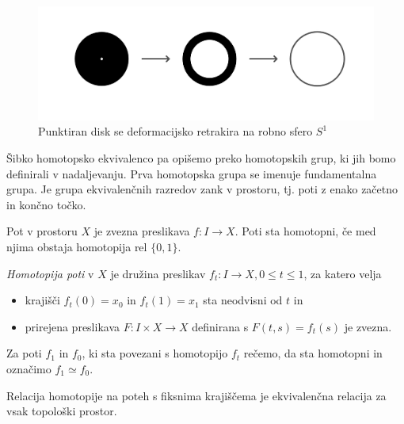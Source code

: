 \documentclass[mat1]{fmfdelo}
\begin{document}
\begin{figure}[h!]
    \centering
    \includegraphics[width=1\linewidth]{def-retract.png}
    \caption{Punktiran disk se deformacijsko retrakira na robno sfero $S^1$}
\end{figure}

Šibko homotopsko ekvivalenco pa opišemo preko homotopskih grup, ki
 jih bomo definirali v nadaljevanju. Prva homotopska grupa se imenuje
  fundamentalna grupa. Je grupa ekvivalenčnih razredov zank v prostoru, 
 tj. poti z enako začetno in končno točko.

Pot v prostoru $X$ je zvezna preslikava $ f\colon  I \rightarrow X$. Poti sta homotopni, če med njima obstaja homotopija rel $\{0,1\}$.
\begin{definicija}
    
    \emph{Homotopija poti} v $X$ je družina preslikav $f_t\colon I \rightarrow X, 0\le t \le 1$, za katero velja
    \begin{itemize}
        \item 
        krajišči $f_t(0) = x_0$ in $f_t(1) = x_1$ sta neodvisni od $t$ in
        \item 
        prirejena preslikava $F\colon I\times X \rightarrow X$ definirana s $F(t,s) = f_t(s)$ je zvezna.
    \end{itemize}
    Za poti $f_1$ in $f_0$, ki sta povezani s homotopijo $f_t$ rečemo, da sta homotopni in označimo $f_1 \simeq f_0$.
\end{definicija}



\begin{trditev}
    Relacija homotopije na poteh s fiksnima krajiščema je ekvivalenčna relacija za vsak topološki prostor.
\end{trditev}
\end{document}
